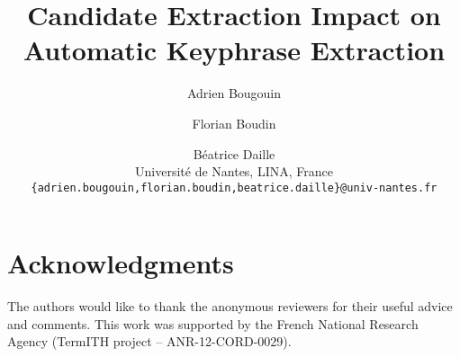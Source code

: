 \documentclass[11pt]{article}
\title{Candidate Extraction Impact on Automatic Keyphrase Extraction}
\author{
  Adrien Bougouin \and Florian Boudin \and Béatrice Daille\\
  Université de Nantes, LINA, France\\
  {\tt \{adrien.bougouin,florian.boudin,beatrice.daille\}@univ-nantes.fr}
}
\date{}
\begin{document}
  \maketitle
  \begin{abstract}
    \textcolor{red}{\lipsum[1]}
  \end{abstract}

  

  \section*{Acknowledgments}
  The authors would like to thank the anonymous reviewers for their useful
  advice and comments. This work was supported by the French National Research
  Agency (TermITH project -- ANR-12-CORD-0029).

  
  
\end{document}

